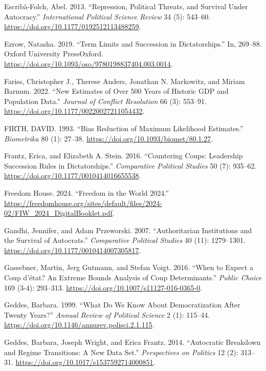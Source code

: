 \documentclass[
  12pt,
]{report}
\newlength{\cslhangindent}
\newenvironment{CSLReferences}[2] %
 {\begin{list}{}{%
  \setlength{\itemindent}{0pt}
  \setlength{\leftmargin}{0pt}
  \setlength{\parsep}{0pt}
  \ifodd #1
   \setlength{\leftmargin}{\cslhangindent}
   \setlength{\itemindent}{-1\cslhangindent}
  \fi
  \setlength{\itemsep}{#2\baselineskip}}}
 {\end{list}}
\begin{document}
\begin{CSLReferences}{1}{0}
Escribà-Folch, Abel. 2013. {``Repression, Political Threats, and
Survival Under Autocracy.''} \emph{International Political Science
Review} 34 (5): 543--60. \url{https://doi.org/10.1177/0192512113488259}.

Ezrow, Natasha. 2019. {``Term Limits and Succession in Dictatorships.''}
In, 269--88. Oxford University PressOxford.
\url{https://doi.org/10.1093/oso/9780198837404.003.0014}.

Fariss, Christopher J., Therese Anders, Jonathan N. Markowitz, and
Miriam Barnum. 2022. {``New Estimates of Over 500 Years of Historic GDP
and Population Data.''} \emph{Journal of Conflict Resolution} 66 (3):
553--91. \url{https://doi.org/10.1177/00220027211054432}.

FIRTH, DAVID. 1993. {``Bias Reduction of Maximum Likelihood
Estimates.''} \emph{Biometrika} 80 (1): 27--38.
\url{https://doi.org/10.1093/biomet/80.1.27}.

Frantz, Erica, and Elizabeth A. Stein. 2016. {``Countering Coups:
Leadership Succession Rules in Dictatorships.''} \emph{Comparative
Political Studies} 50 (7): 935--62.
\url{https://doi.org/10.1177/0010414016655538}.

Freedom House. 2024. {``Freedom in the World 2024.''}
\url{https://freedomhouse.org/sites/default/files/2024-02/FIW_2024_DigitalBooklet.pdf}.

Gandhi, Jennifer, and Adam Przeworski. 2007. {``Authoritarian
Institutions and the Survival of Autocrats.''} \emph{Comparative
Political Studies} 40 (11): 1279--1301.
\url{https://doi.org/10.1177/0010414007305817}.

Gassebner, Martin, Jerg Gutmann, and Stefan Voigt. 2016. {``When to
Expect a Coup d{'}état? An Extreme Bounds Analysis of Coup
Determinants.''} \emph{Public Choice} 169 (3-4): 293--313.
\url{https://doi.org/10.1007/s11127-016-0365-0}.

Geddes, Barbara. 1999. {``What Do We Know About Democratization After
Twenty Years?''} \emph{Annual Review of Political Science} 2 (1):
115--44. \url{https://doi.org/10.1146/annurev.polisci.2.1.115}.

Geddes, Barbara, Joseph Wright, and Erica Frantz. 2014. {``Autocratic
Breakdown and Regime Transitions: A New Data Set.''} \emph{Perspectives
on Politics} 12 (2): 313--31.
\url{https://doi.org/10.1017/s1537592714000851}.


\end{CSLReferences}
\end{document}
